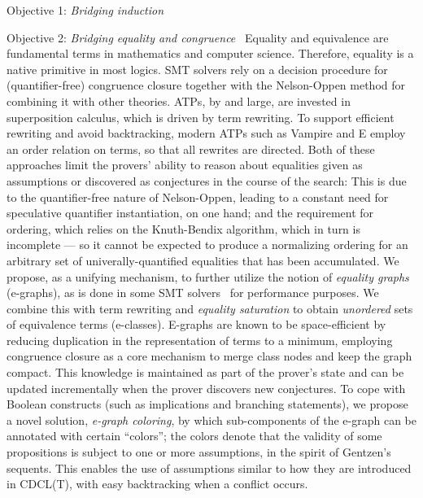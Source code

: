 \begin{paragraph}{Objective 1: {\it Bridging induction}}

\end{paragraph}


\begin{paragraph}{Objective 2: {\it Bridging equality and congruence}}~
Equality and equivalence are fundamental terms in mathematics and computer science.
Therefore, equality is a native primitive in most logics.
SMT solvers rely on a decision procedure for (quantifier-free) congruence closure together with the Nelson-Oppen method for combining it with other theories.
ATPs, by and large, are invested in superposition calculus, which is driven by term rewriting.
To support efficient rewriting and avoid backtracking, modern ATPs such as Vampire and E employ an order relation on terms, so that all rewrites are directed.
Both of these approaches limit the provers' ability to reason about equalities given as assumptions or discovered as conjectures in the course of the search:
This is due to the quantifier-free nature of Nelson-Oppen, leading to a constant need for speculative quantifier instantiation, on one hand;
and the requirement for ordering, which relies on the Knuth-Bendix algorithm, which in turn is incomplete --- so it cannot be expected to produce a normalizing ordering for an arbitrary set of univerally-quantified equalities that has been accumulated.
We propose, as a unifying mechanism, to further utilize the notion of \emph{equality graphs} (e-graphs), as is done in some SMT solvers~\citeneeded{} for performance purposes.
We combine this with term rewriting and \emph{equality saturation} to obtain \emph{unordered} sets of equivalence terms (e-classes).
E-graphs are known to be space-efficient by reducing duplication in the representation of terms to a minimum, employing congruence closure as a core mechanism to merge class nodes and keep the graph compact.
This knowledge is maintained as part of the prover's state and can be updated incrementally when the prover discovers new conjectures.
To cope with Boolean constructs (such as implications and branching statements), we propose a novel solution, \emph{e-graph coloring}, by which sub-components of the e-graph can be annotated with certain ``colors''; the colors denote that the validity of some propositions is subject to one or more assumptions, in the spirit of Gentzen's sequents.
This enables the use of assumptions similar to how they are introduced in CDCL(T), with easy backtracking when a conflict occurs.
\end{paragraph}

